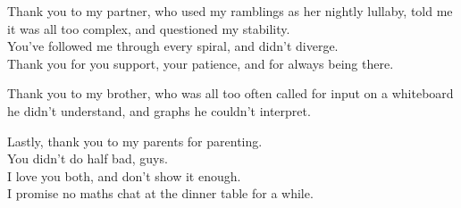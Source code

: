 \par Thank you to my partner, who used my ramblings as her nightly lullaby, told me it was all too complex, and questioned my stability.\\
You've followed me through every spiral, and didn't diverge.\\
Thank you for you support, your patience, and for always being there.\\

\par Thank you to my brother, who was all too often called for input on a whiteboard he didn't understand, and graphs he couldn't interpret.\\

\par Lastly, thank you to my parents for parenting.\\
You didn't do half bad, guys.\\ 
I love you both, and don't show it enough.\\
I promise no maths chat at the dinner table for a while.\\
